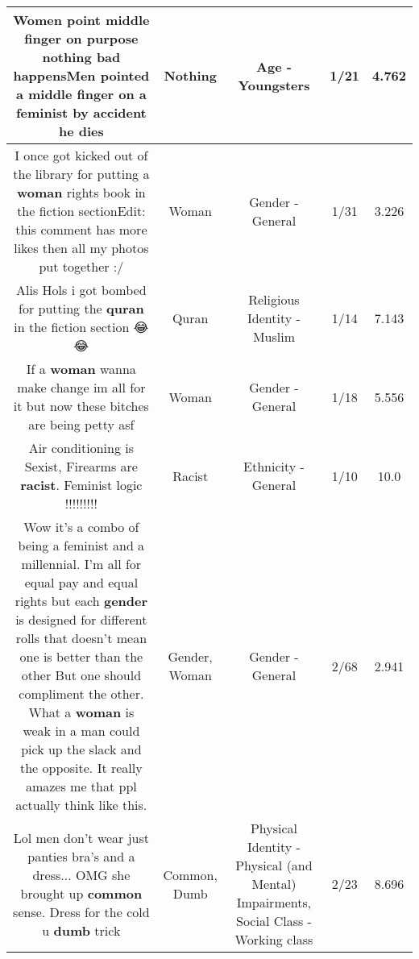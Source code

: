 \documentclass[11pt]{article}
\newlength\mylength
\begin{document}
\begin{center}
\begin{longtable}{|C{.65\mylength}|C{.30\mylength}|C{.12\mylength}|C{.12\mylength}|C{.12\mylength}|}
  \small Women point middle finger on purpose \textbf{nothing} bad happensMen pointed a middle finger on a feminist by accident he dies\normalsize   & Nothing & Age - Youngsters & 1/21 & 4.762 \\  \hline
  \small I once got kicked out of the library for putting a \textbf{woman} rights book in the fiction sectionEdit: this comment has more likes then all my photos put together :/\normalsize   & Woman & Gender - General & 1/31 & 3.226 \\  \hline
  \small Alis Hols i got bombed for putting the \textbf{quran} in the fiction section 😂😂\normalsize   & Quran & Religious Identity - Muslim & 1/14 & 7.143 \\  \hline
  \small If a \textbf{woman} wanna make change im all for it but now these bitches are being petty asf\normalsize   & Woman & Gender - General & 1/18 & 5.556 \\  \hline
  \small Air conditioning is Sexist, Firearms are \textbf{racist}. Feminist logic !!!!!!!!!\normalsize   & Racist & Ethnicity - General & 1/10 & 10.0 \\  \hline
  \small Wow it's a combo of being a feminist and a millennial. I'm all for equal pay and equal rights but each \textbf{gender} is designed for different rolls that doesn't mean one is better than the other But one should compliment the other. What a \textbf{woman} is weak in a man could pick up the slack and the opposite. It really amazes me that ppl actually think like this.\normalsize   & Gender, Woman & Gender - General & 2/68 & 2.941 \\  \hline
  \small Lol men don't wear just panties bra's and a dress... OMG she brought up \textbf{common} sense. Dress for the cold u \textbf{dumb} trick\normalsize   & Common, Dumb & Physical Identity - Physical (and Mental) Impairments, Social Class - Working class & 2/23 & 8.696 \\  \hline

\end{longtable}
\end{center}
\end{document}
